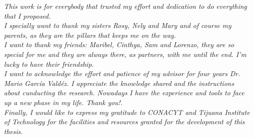 
\textit{This work is for everybody that trusted my effort and
dedication to do everything that I proposed.\\  I specially want to thank
my sisters Rosy, Nely and Mary and of course my parents,
as they are the pillars that keeps me on the way.\\  I want to thank my
friends: Maribel, Cinthya, Sam and Lorenzo, they are so special for me
and they are always there, as partners, with me until the end.
I’m lucky to have their friendship.\\  I want to acknowledge the effort and
patience of my advisor  for four years Dr. Mario Garc\'ia Vald\'ez. I appreciate the
knowledge shared and the instructions about cunducting the research. Nowadays I
have the experience and tools to face up a new phase in my life. Thank you!.\\  
Finally, I would like to express my gratitude to CONACYT and
Tijuana Institute of Technology for the facilities and resources
granted for the development of this thesis.}
